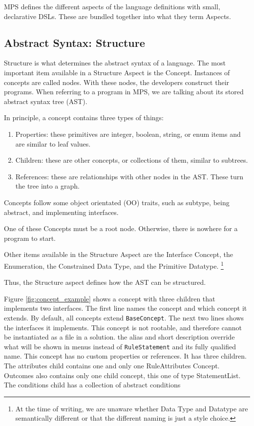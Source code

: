 MPS defines the different aspects of the language definitions with small, declarative DSLs.
These are bundled together into what they term Aspects.

\subsection{Abstract Syntax: Structure}
Structure is what determines the abstract syntax of a language.
The most important item available in a Structure Aspect is the Concept.
Instances of concepts are called nodes.
With these nodes, the developers construct their programs.
When referring to a program in MPS, we are talking about its stored abstract syntax tree (AST).

In principle, a concept contains three types of things:
\begin{enumerate}
    \setlength\itemsep{0em}
    \item Properties: these primitives are integer, boolean, string, or enum items and are similar to leaf values.
    \item Children: these are other concepts, or collections of them, similar to subtrees.
    \item References: these are relationships with other nodes in the AST. These turn the tree into a graph.
\end{enumerate}

Concepts follow some object orientated (OO) traits, such as subtype, being abstract, and implementing interfaces.

One of these Concepts must be a root node. 
Otherwise, there is nowhere for a program to start.

Other items available in the Structure Aspect are the Interface Concept, the Enumeration, the Constrained Data Type, and the Primitive Datatype.
\footnote{At the time of writing, we are unaware whether Data Type and Datatype are semantically different or that the different naming is just a style choice.}

Thus, the Structure aspect defines how the AST can be structured.

Figure \ref{fig:concept_example} shows a concept with three children that implements two interfaces.
The first line names the concept and which concept it extends.
By default, all concepts extend \texttt{BaseConcept}.
The next two lines shows the interfaces it implements.
This concept is not rootable, and therefore cannot be instantiated as a file in a solution.
the alias and short description override what will be shown in menus instead of \texttt{RuleStatement} and its fully qualified name.
This concept has no custom properties or references.
It has three children.
The attributes child contains one and only one RuleAttributes Concept.
Outcomes also contains only one child concept, this one of type StatementList.
The conditions child has a collection of abstract conditions

